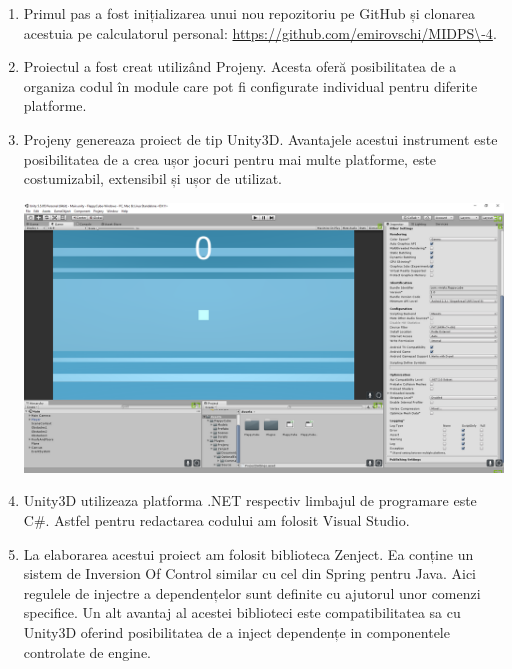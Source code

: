 \begin{enumerate}
\item Primul pas a fost inițializarea unui nou repozitoriu pe GitHub și clonarea acestuia pe calculatorul personal: \url{https://github.com/emirovschi/MIDPS\-4}.
\item Proiectul a fost creat utilizând Projeny\cite{Projeny}. Acesta oferă posibilitatea de a organiza codul în module care pot fi configurate individual pentru diferite platforme.
\item Projeny genereaza proiect de tip Unity3D\cite{Unity3D}. Avantajele acestui instrument este posibilitatea de a crea ușor jocuri pentru mai multe platforme, este costumizabil, extensibil și ușor de utilizat.

\begin{minipage}{\linewidth}
	\centering
	\includegraphics[width=17cm]{unity}
\end{minipage}
\break

\item Unity3D utilizeaza platforma .NET respectiv limbajul de programare este C\#\cite{CSharp}. Astfel pentru redactarea codului am folosit Visual Studio\cite{vs}.
\item La elaborarea acestui proiect am folosit biblioteca Zenject\cite{Zenject}. Ea conține un sistem de Inversion Of Control similar cu cel din Spring pentru Java. Aici regulele de injectre a dependențelor sunt definite cu ajutorul unor comenzi specifice. Un alt avantaj al acestei biblioteci este compatibilitatea sa cu Unity3D oferind posibilitatea de a inject dependențe in componentele controlate de engine.


\end{enumerate}
